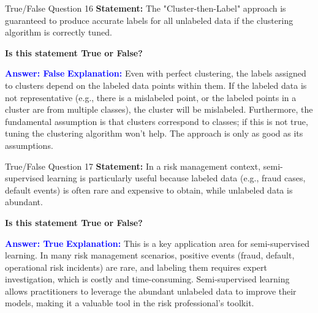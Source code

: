 \documentclass{beamer}
\begin{document}
	\begin{frame}{True/False Question 16}
		\textbf{Statement:} The "Cluster-then-Label" approach is guaranteed to produce accurate labels for all unlabeled data if the clustering algorithm is correctly tuned.
		
		\vspace{0.3cm}
		\textbf{Is this statement True or False?}
		
		\vspace{0.2cm}
		\textcolor{blue}{\textbf{Answer: False}}
		\vspace{0.2cm}
		\textcolor{blue}{\textbf{Explanation:}} Even with perfect clustering, the labels assigned to clusters depend on the labeled data points within them. If the labeled data is not representative (e.g., there is a mislabeled point, or the labeled points in a cluster are from multiple classes), the cluster will be mislabeled. Furthermore, the fundamental assumption is that clusters correspond to classes; if this is not true, tuning the clustering algorithm won't help. The approach is only as good as its assumptions.
	\end{frame}
	
	\begin{frame}{True/False Question 17}
		\textbf{Statement:} In a risk management context, semi-supervised learning is particularly useful because labeled data (e.g., fraud cases, default events) is often rare and expensive to obtain, while unlabeled data is abundant.
		
		\vspace{0.3cm}
		\textbf{Is this statement True or False?}
		
		\vspace{0.2cm}
		\textcolor{blue}{\textbf{Answer: True}}
		\vspace{0.2cm}
		\textcolor{blue}{\textbf{Explanation:}} This is a key application area for semi-supervised learning. In many risk management scenarios, positive events (fraud, default, operational risk incidents) are rare, and labeling them requires expert investigation, which is costly and time-consuming. Semi-supervised learning allows practitioners to leverage the abundant unlabeled data to improve their models, making it a valuable tool in the risk professional's toolkit.
	\end{frame}
	
\end{document}
